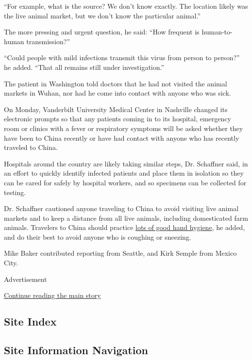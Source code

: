 ``For example, what is the source? We don't know exactly. The location
likely was the live animal market, but we don't know the particular
animal.''

The more pressing and urgent question, he said: ``How frequent is
human-to-human transmission?''

``Could people with mild infections transmit this virus from person to
person?'' he added. ``That all remains still under investigation.''

The patient in Washington told doctors that he had not visited the
animal markets in Wuhan, nor had he come into contact with anyone who
was sick.

On Monday, Vanderbilt University Medical Center in Nashville changed its
electronic prompts so that any patients coming in to its hospital,
emergency room or clinics with a fever or respiratory symptoms will be
asked whether they have been to China recently or have had contact with
anyone who has recently traveled to China.

Hospitals around the country are likely taking similar steps, Dr.
Schaffner said, in an effort to quickly identify infected patients and
place them in isolation so they can be cared for safely by hospital
workers, and so specimens can be collected for testing.

Dr. Schaffner cautioned anyone traveling to China to avoid visiting live
animal markets and to keep a distance from all live animals, including
domesticated farm animals. Travelers to China should practice
\href{https://www.nytimes3xbfgragh.onion/2016/04/21/health/washing-hands.html}{lots
of good hand hygiene}, he added, and do their best to avoid anyone who
is coughing or sneezing.

Mike Baker contributed reporting from Seattle, and Kirk Semple from
Mexico City.

Advertisement

\protect\hyperlink{after-bottom}{Continue reading the main story}

\hypertarget{site-index}{%
\subsection{Site Index}\label{site-index}}

\hypertarget{site-information-navigation}{%
\subsection{Site Information
Navigation}\label{site-information-navigation}}

